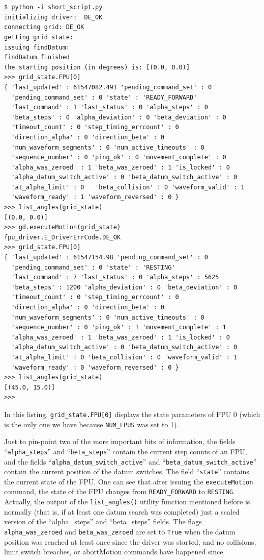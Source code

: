 \documentclass[11pt,a4paper]{report}
\begin{document}
\begin{verbatim}

  
$ python -i short_script.py
initializing driver:  DE_OK
connecting grid: DE_OK
getting grid state:
issuing findDatum:
findDatum finished
the starting position (in degrees) is: [(0.0, 0.0)]
>>> grid_state.FPU[0]
{ 'last_updated' : 61547082.491 'pending_command_set' : 0
  'pending_command_set' : 0 'state' : 'READY_FORWARD'
  'last_command' : 1 'last_status' : 0 'alpha_steps' : 0
  'beta_steps' : 0 'alpha_deviation' : 0 'beta_deviation' : 0
  'timeout_count' : 0 'step_timing_errcount' : 0
  'direction_alpha' : 0 'direction_beta' : 0
  'num_waveform_segments' : 0 'num_active_timeouts' : 0
  'sequence_number' : 0 'ping_ok' : 0 'movement_complete' : 0
  'alpha_was_zeroed' : 1 'beta_was_zeroed' : 1 'is_locked' : 0
  'alpha_datum_switch_active' : 0 'beta_datum_switch_active' : 0
  'at_alpha_limit' : 0   'beta_collision' : 0 'waveform_valid' : 1
  'waveform_ready' : 1 'waveform_reversed' : 0 }
>>> list_angles(grid_state)
[(0.0, 0.0)]
>>> gd.executeMotion(grid_state)
fpu_driver.E_DriverErrCode.DE_OK
>>> grid_state.FPU[0]
{ 'last_updated' : 61547154.98 'pending_command_set' : 0
  'pending_command_set' : 0 'state' : 'RESTING'
  'last_command' : 7 'last_status' : 0 'alpha_steps' : 5625
  'beta_steps' : 1200 'alpha_deviation' : 0 'beta_deviation' : 0
  'timeout_count' : 0 'step_timing_errcount' : 0
  'direction_alpha' : 0 'direction_beta' : 0
  'num_waveform_segments' : 0 'num_active_timeouts' : 0
  'sequence_number' : 0 'ping_ok' : 1 'movement_complete' : 1
  'alpha_was_zeroed' : 1 'beta_was_zeroed' : 1 'is_locked' : 0
  'alpha_datum_switch_active' : 0 'beta_datum_switch_active' : 0
  'at_alpha_limit' : 0 'beta_collision' : 0 'waveform_valid' : 1
  'waveform_ready' : 0 'waveform_reversed' : 0 }
>>> list_angles(grid_state)
[(45.0, 15.0)]
>>>
\end{verbatim}

In this listing, \verb+grid_state.FPU[0]+ displays the state parameters of
FPU 0 (which is the only one we have because \texttt{NUM\_FPUS} was
set to 1).

Just to pin-point two of the more important bits of information, the
fields ``\texttt{alpha\_steps}'' and ``\texttt{beta\_steps}'' contain
the current step counts of an FPU, and the fields
``\texttt{alpha\_datum\_switch\_active}'' and
``\texttt{beta\_datum\_switch\_active}'' contain the current position
of the datum switches. The field ``\texttt{state}'' contains the
current state of the FPU. One can see that after issuing the
\texttt{executeMotion} command, the state of the FPU changes from
\texttt{READY\_FORWARD} to \texttt{RESTING}. Actually, the output of
the \texttt{list\_angles()} utility function mentioned before is
normally (that is, if at least one datum search was completed) just a
scaled version of the ``alpha\_steps'' and ``beta\_steps'' fields. The
flags \texttt{alpha\_was\_zeroed} and \texttt{beta\_was\_zeroed} are
set to \texttt{True} when the datum position was reached at least once
since the driver was started, and no collisions, limit switch
breaches, or abortMotion commands have happened since.
\end{document}
